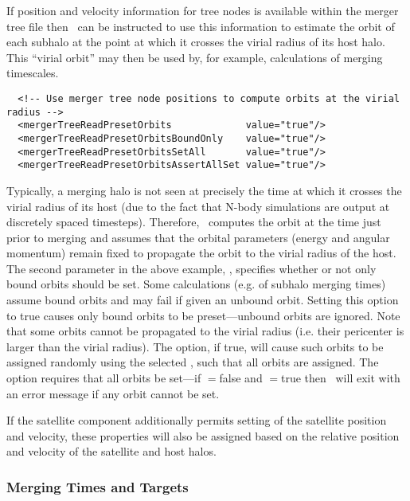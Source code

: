 If position and velocity information for tree nodes is available within the merger tree file then \glc\ can be instructed to use this information to estimate the orbit of each subhalo at the point at which it crosses the virial radius of its host halo. This ``virial orbit'' may then be used by, for example, calculations of merging timescales.
\begin{verbatim}
  <!-- Use merger tree node positions to compute orbits at the virial radius -->
  <mergerTreeReadPresetOrbits             value="true"/>
  <mergerTreeReadPresetOrbitsBoundOnly    value="true"/>
  <mergerTreeReadPresetOrbitsSetAll       value="true"/>
  <mergerTreeReadPresetOrbitsAssertAllSet value="true"/>
\end{verbatim}
Typically, a merging halo is not seen at precisely the time at which it crosses the virial radius of its host (due to the fact that N-body simulations are output at discretely spaced timesteps). Therefore, \glc\ computes the orbit at the time just prior to merging and assumes that the orbital parameters (energy and angular momentum) remain fixed to propagate the orbit to the virial radius of the host. The second parameter in the above example, {\normalfont \ttfamily [mergerTreeReadPresetOrbitsBoundOnly]}, specifies whether or not only bound orbits should be set. Some calculations (e.g. of subhalo merging times) assume bound orbits and may fail if given an unbound orbit. Setting this option to {\normalfont \ttfamily true} causes only bound orbits to be preset---unbound orbits are ignored. Note that some orbits cannot be propagated to the virial radius (i.e. their pericenter is larger than the virial radius). The {\normalfont \ttfamily [mergerTreeReadPresetOrbitsSetAll]} option, if true, will cause such orbits to be assigned randomly using the selected {\normalfont \ttfamily [virialOrbitsMethod]}, such that all orbits are assigned. The {\normalfont \ttfamily [mergerTreeReadPresetOrbitsAssertAllSet]} option requires that all orbits be set---if {\normalfont \ttfamily [mergerTreeReadPresetOrbitsSetAll]}$=${\normalfont \ttfamily false} and {\normalfont \ttfamily [mergerTreeReadPresetOrbitsAssertAllSet]}$=${\normalfont \ttfamily true} then \glc\ will exit with an error message if any orbit cannot be set.

If the satellite component additionally permits setting of the satellite position and velocity, these properties will also be assigned based on the relative position and velocity of the satellite and host halos.

\subsubsection{Merging Times and Targets}

